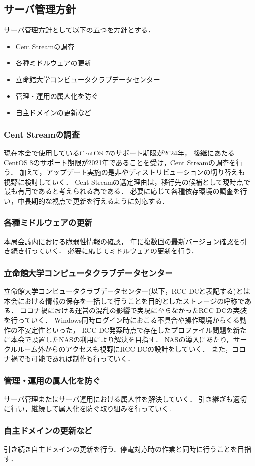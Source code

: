 \subsection*{サーバ管理方針}


サーバ管理方針として以下の五つを方針とする．
\begin{itemize}
    \item Cent Streamの調査
    \item 各種ミドルウェアの更新
    \item 立命館大学コンピュータクラブデータセンター
    \item 管理・運用の属人化を防ぐ
    \item 自主ドメインの更新など
\end{itemize}

\subsubsection*{Cent Streamの調査}
現在本会で使用しているCentOS 7のサポート期限が2024年，
後継にあたるCentOS 8のサポート期限が2021年であることを受け，Cent Streamの調査を行う．
加えて，アップデート実施の是非やディストリビューションの切り替えも視野に検討していく．
Cent Streamの選定理由は，移行先の候補として現時点で最も有用であると考えられる為である．
必要に応じて各種依存環境の調査を行い，中長期的な視点で更新を行えるように対応する．

\subsubsection*{各種ミドルウェアの更新}
本局会議内における脆弱性情報の確認，
年に複数回の最新バージョン確認を引き続き行っていく．
必要に応じてミドルウェアの更新を行う．

\subsubsection*{立命館大学コンピュータクラブデータセンター}
立命館大学コンピュータクラブデータセンター(以下，RCC DCと表記する)とは本会における情報の保存を一括して行うことを目的としたストレージの呼称である．
コロナ禍における運営の混乱の影響で実現に至らなかったRCC DCの実装を行っていく．
Windows同時ログイン時におこる不具合や操作環境からくる動作の不安定性といった，
RCC DC発案時点で存在したプロファイル問題を新たに本会で設置したNASの利用により解決を目指す．
NASの導入にあたり，サークルルーム外からのアクセスも視野にRCC DCの設計をしていく．
また，コロナ禍でも可能であれば制作も行っていく．

\subsubsection*{管理・運用の属人化を防ぐ}
サーバ管理またはサーバ運用における属人性を解決していく．
引き継ぎも適切に行い，継続して属人化を防ぐ取り組みを行っていく．

\subsubsection*{自主ドメインの更新など}
引き続き自主ドメインの更新を行う．停電対応時の作業と同時に行うことを目指す．

